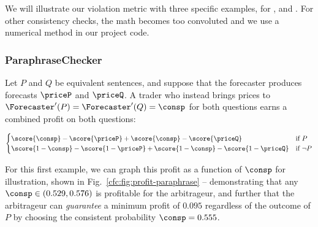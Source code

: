
We will illustrate our violation metric with three specific examples, for \ParaphraseChecker{}, \NegChecker{} and \CondChecker{}. For other consistency checks, the math becomes too convoluted and we use a numerical method in our project code.

\subsubsection{ParaphraseChecker}
\label{cfc:sec:arbitrage-paraphrase}


Let $P$ and $Q$ be equivalent sentences, and suppose that the forecaster produces forecasts $\priceP$ and $\priceQ$. A trader who instead brings prices to $\Forecaster'(P)=\Forecaster'(Q)=\consp$ for both questions earns a combined profit on both questions:

\begin{equation}
\begin{cases}
    \score{\consp}-\score{\priceP}+\score{\consp}-\score{\priceQ} & \text{if } P \\
    \score{1-\consp}-\score{1-\priceP}+\score{1-\consp}-\score{1-\priceQ} & \text{if } \lnot P
\end{cases}
\label{cfc:eq:profit-paraphrase}
\end{equation}

For this first example, we can graph this profit as a function of $\consp$ for illustration, shown in Fig.~\ref{cfc:fig:profit-paraphrase} -- demonstrating that any $\consp\in(0.529,0.576)$ is profitable for the arbitrageur, and further that the arbitrageur can \textit{guarantee} a minimum profit of $0.095$ regardless of the outcome of $P$ by choosing the consistent probability $\consp=0.555$.

